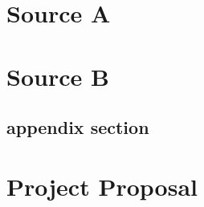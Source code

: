 \documentclass[12pt,a4paper,twoside,openright]{report}
\begin{document}



\appendix

\chapter{Source A}


\chapter{Source B}

\section{appendix section}\label{referencedAppendixTag}


\chapter{Project Proposal}


\end{document}
